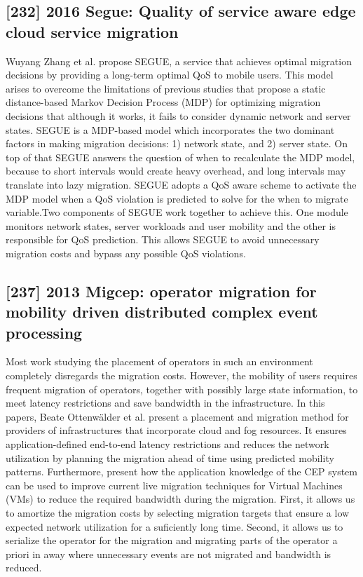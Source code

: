 \subsection{[232] 2016 Segue: Quality of service aware edge cloud service migration}
\label{subsec:paper10}
Wuyang Zhang et al. \cite{zhang2016segue} propose SEGUE, a service that achieves optimal migration decisions by providing a long-term optimal QoS to mobile users. This model arises to overcome the limitations of previous studies that propose a static distance-based Markov Decision Process (MDP) for optimizing migration decisions that although it works, it fails to consider dynamic network and server states. SEGUE is a MDP-based model which incorporates the two dominant factors in making migration decisions: 1) network state, and 2) server state. On top of that SEGUE answers the question of when to recalculate the MDP model, because to short intervals would create heavy overhead, and long intervals may translate into lazy migration. SEGUE adopts a QoS aware scheme to activate the MDP model when a QoS violation is predicted to solve for the when to migrate variable.Two components of SEGUE work together to achieve this. One module monitors network states, server workloads and user mobility and the other is responsible for QoS prediction. This allows SEGUE to avoid unnecessary migration costs and bypass any possible QoS violations.

\subsection{[237] 2013 Migcep: operator migration for mobility driven distributed complex event processing}
\label{subsec:paper12}
Most work studying the placement of operators in such an environment completely disregards the migration costs. However, the mobility of users requires frequent migration of operators, together with possibly large state information, to meet latency restrictions and save bandwidth in the infrastructure. In this papers, Beate Ottenwälder et al. \cite{ottenwalder2013migcep} present a placement and migration method for providers of infrastructures that incorporate cloud and fog resources. It ensures application-defined end-to-end latency restrictions and reduces the network utilization by planning the migration ahead of time using predicted mobility patterns. Furthermore, present how the application knowledge of the CEP system can be used to improve current live migration techniques for Virtual Machines (VMs) to reduce the required bandwidth during the migration. First, it allows us to amortize the migration costs by selecting migration targets that ensure a low expected network utilization for a suficiently long time. Second, it allows us to serialize the operator for the migration and migrating parts of the operator a priori in away where unnecessary events are not migrated and bandwidth is reduced.

